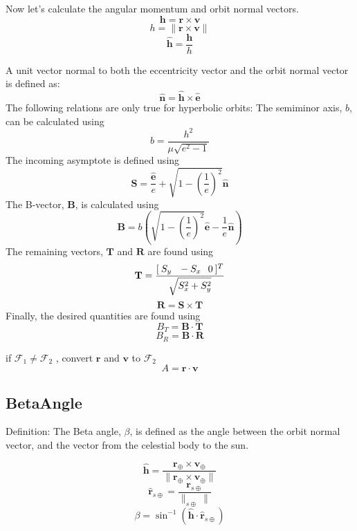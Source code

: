 Now let's calculate the angular momentum and orbit normal vectors.
%
\[
\mathbf{h} = \mathbf{r}\times \mathbf{v}
\]
%
\[
h = \| \mathbf{r}\times \mathbf{v} \|
\]
%
\[
\hat{\mathbf{h}} = \frac{\mathbf{h}}{h}
\]

A unit vector normal to both the eccentricity vector and the orbit
normal vector is defined as:
%
\[
   \hat{\mathbf{n}} = \hat{\mathbf{h}} \times \hat{\mathbf{e}}
\]
The following relations are only true for hyperbolic orbits: The
semiminor axis, $b$, can be calculated using
%
\[
   b = \frac{h^2}{\mu \sqrt{e^2 - 1}}
\]
%
The incoming asymptote is defined using
%
\[
   \mathbf{S} =  \frac{\hat{\mathbf{e}} }{e} + \sqrt{1 - \left(\frac{1}{e}\right)^2
   }\hat{\mathbf{n}}
\]
%
The B-vector, $\mathbf{B}$, is calculated using
%
\[
   \mathbf{B} = b \left(\sqrt{1 - \left(\frac{1}{e}\right)^2 }\hat{\mathbf{e}}  - \frac{1}{e} \hat{\mathbf{n}} \right)
\]
%
The remaining vectors, $\mathbf{T}$ and $\mathbf{R}$ are found using
%
\[
   \mathbf{T} = \frac{[\hspace{.03 in} S_y \hspace{.1 in} -S_x  \hspace{.1 in} 0 \hspace{.03 in}]^T }{\sqrt{S_x^2 + S_y^2}}
\]
%
\[
   \mathbf{R} = \mathbf{S} \times \mathbf{T}
\]
%
Finally, the desired quantities are found using
%
\[
   B_T = \mathbf{B} \cdot \mathbf{T}
\]
%
\[
   B_R = \mathbf{B} \cdot \mathbf{R}
\]



\noindent if  $\mathcal{F}_1 \neq \mathcal{F}_2$ , convert
$\mathbf{r}$ and $\mathbf{v}$ to $\mathcal{F}_2$
%
\begin{equation}
    A = \mathbf{r}\cdot\mathbf{v}
\end{equation}

\subsection{BetaAngle} 

Definition:  The Beta angle, $\beta$, is defined as the angle
between the orbit normal vector, and the vector from the celestial
body to the sun.

\[
   \hat{\mathbf{h}} = \frac{  \mathbf{r}_\oplus \times \mathbf{v}_\oplus  }{\|\mathbf{r}_\oplus \times \mathbf{v}_\oplus \|}
\]
%
\[
\hat{\mathbf{r}}_{s \oplus} = \frac{\mathbf{r}_{s \oplus}}{\|_{s
\oplus }  \|}
\]
%
\begin{equation}
  \beta = \sin^{-1}\left(\hat{\mathbf{h}}\cdot \hat{\mathbf{r}}_{s\oplus } \right)
\end{equation}

